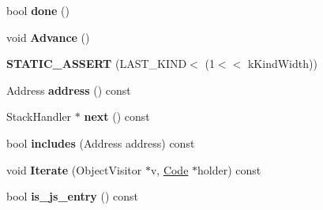 \begin{DoxyCompactItemize}
\item 
\hypertarget{classv8_1_1internal_1_1_b_a_s_e___e_m_b_e_d_d_e_d_a2c3784acfb2f6c0daf399b0c8ef1798f}{}bool {\bfseries done} ()\label{classv8_1_1internal_1_1_b_a_s_e___e_m_b_e_d_d_e_d_a2c3784acfb2f6c0daf399b0c8ef1798f}

\item 
\hypertarget{classv8_1_1internal_1_1_b_a_s_e___e_m_b_e_d_d_e_d_a4b06fdbbb29fc7d6641a995803b6d7ec}{}void {\bfseries Advance} ()\label{classv8_1_1internal_1_1_b_a_s_e___e_m_b_e_d_d_e_d_a4b06fdbbb29fc7d6641a995803b6d7ec}

\item 
\hypertarget{classv8_1_1internal_1_1_b_a_s_e___e_m_b_e_d_d_e_d_a53e0a75c5778e05538f577e4279d6128}{}{\bfseries S\+T\+A\+T\+I\+C\+\_\+\+A\+S\+S\+E\+R\+T} (L\+A\+S\+T\+\_\+\+K\+I\+N\+D$<$ (1$<$$<$ k\+Kind\+Width))\label{classv8_1_1internal_1_1_b_a_s_e___e_m_b_e_d_d_e_d_a53e0a75c5778e05538f577e4279d6128}

\item 
\hypertarget{classv8_1_1internal_1_1_b_a_s_e___e_m_b_e_d_d_e_d_a1920403567fc80185c82da2b19917d5a}{}Address {\bfseries address} () const \label{classv8_1_1internal_1_1_b_a_s_e___e_m_b_e_d_d_e_d_a1920403567fc80185c82da2b19917d5a}

\item 
\hypertarget{classv8_1_1internal_1_1_b_a_s_e___e_m_b_e_d_d_e_d_a46f7b598557ec760c6fad88613b37aed}{}Stack\+Handler $\ast$ {\bfseries next} () const \label{classv8_1_1internal_1_1_b_a_s_e___e_m_b_e_d_d_e_d_a46f7b598557ec760c6fad88613b37aed}

\item 
\hypertarget{classv8_1_1internal_1_1_b_a_s_e___e_m_b_e_d_d_e_d_ac41fcccf5c18eca218f220d07495e507}{}bool {\bfseries includes} (Address address) const \label{classv8_1_1internal_1_1_b_a_s_e___e_m_b_e_d_d_e_d_ac41fcccf5c18eca218f220d07495e507}

\item 
\hypertarget{classv8_1_1internal_1_1_b_a_s_e___e_m_b_e_d_d_e_d_a7866aa786fe6073c90eb1269fdb903a9}{}void {\bfseries Iterate} (Object\+Visitor $\ast$v, \hyperlink{classv8_1_1internal_1_1_code}{Code} $\ast$holder) const \label{classv8_1_1internal_1_1_b_a_s_e___e_m_b_e_d_d_e_d_a7866aa786fe6073c90eb1269fdb903a9}

\item 
\hypertarget{classv8_1_1internal_1_1_b_a_s_e___e_m_b_e_d_d_e_d_af7099c43d87196ce3610b49826a66e9b}{}bool {\bfseries is\+\_\+js\+\_\+entry} () const \label{classv8_1_1internal_1_1_b_a_s_e___e_m_b_e_d_d_e_d_af7099c43d87196ce3610b49826a66e9b}


\end{DoxyCompactItemize}
